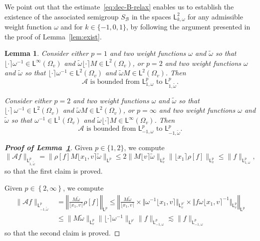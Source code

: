 \documentclass[11pt]{amsart}
\newtheorem{lemma}[theorem]{Lemma}
\theoremstyle{definition}
\theoremstyle{remark}
\numberwithin{equation}{section}
\def\AA{{\mathcal A}}
\def\BB{{\mathcal B}}
\newcommand{\sfL}{\mathsf{L}}
\newcommand{\wangle}[1]{\lfloor #1 \rceil}
\begin{document}
We point out that the estimate~\eqref{eq:dec-B-relax} enables us to establish the existence of the associated semigroup $S_\BB$ in the spaces $\sfL^{2}_{k,\omega}$ for any admissible weight function $\omega$ and for $k \in \{-1, 0, 1\}$, by following the argument presented in the proof of Lemma~\ref{lem:exist}.

\begin{lemma}
  \label{lem-relax-AAf}
  Consider either $p = 1$ and two weight functions $\omega$ and $\tilde{\omega}$ so that $\wangle{\cdot} \omega ^{-1} \in \sfL^{\infty}(\Omega_v)$ and $\tilde \omega \wangle{\cdot} M \in \sfL^{2}(\Omega_v)$, or $p=2$ and two weight functions $\omega$ and $\tilde{\omega}$ so that   $\wangle{\cdot} \omega ^{-1} \in \sfL^{2}(\Omega_v)$ and $\tilde \omega  M \in \sfL^{2}(\Omega_v)$. Then
  \begin{equation*}
    \text{$\AA$ is bounded from $\sfL^{p}_{1,\omega}$ to $\sfL^{p}_{1,\tilde \omega}$.}
  \end{equation*}

  Consider either $p= 2$ and two weight functions $\omega$ and $\tilde{\omega}$ so that $\wangle{\cdot} \,\omega^{-1} \in \sfL^{2}(\Omega_v)$ and $\tilde \omega M \in \sfL^{2}(\Omega_v)$, or $p=\infty$ and two weight functions $\omega$ and $\tilde{\omega}$ so that $\omega^{-1} \in \sfL^{1}(\Omega_v)$ and $\tilde \omega \wangle{\cdot} M \in \sfL^{\infty}(\Omega_v)$. Then
  \begin{equation*}
    \text{$\AA$ is bounded from $\sfL^{p}_{-1,\omega}$ to $\sfL^{p}_{-1,\tilde \omega}$.}
  \end{equation*}
\end{lemma}

\begin{proof}[{\bf \bf Proof of Lemma~\ref{lem-relax-AAf}}]
  Given $p \in \lbrace 1 , 2 \rbrace$, we compute
  \begin{equation*}
    \| \AA f \|_{\sfL^{p}_{1,\tilde \omega}}
    = \big\| \rho[f] M \wangle{x_1,v} \tilde \omega \big\|_{\sfL^{p}} \le 2 \big\| M \wangle{v}\tilde \omega \big\|_{\sfL^{p}_v}  \big\| \wangle{x_1} \rho[f] \big\|_{\sfL^{p}_x}
    \le \|   f \|_{\sfL^{p}_{1,\omega }},
  \end{equation*}
  so that the first claim is proved.

  Given $p \in \left\lbrace 2, \infty \right\rbrace$, we compute
  \begin{align*}
    \| \AA f \|_{\sfL^{p}_{-1,\tilde \omega}}
    &= \left\Vert \frac{M \tilde \omega}{\wangle{x_1,v}} \rho[f]  \right \Vert_{\sfL^{p}} \leq \left\Vert \frac{M \tilde \omega}{\wangle{x_1,v}} \times \big\Vert \omega^{-1} \wangle{x_1,v}\big\Vert_{\sfL_{v}^{p'}} \times \big\Vert f \omega \wangle{x_1,v}^{-1}\big\Vert_{\sfL^p_v} \right\Vert_{\sfL^{p}}\\
    &\le \|  M \tilde \omega   \|_{\sfL^{p}_v} \| \wangle{\cdot} \omega^{-1} \|_{\sfL^{p'}} \| f \|_{\sfL^{p}_{-1,\omega}} \lesssim \| f \|_{\sfL^{p}_{-1,\omega}}
  \end{align*}
  so that the second claim is proved.
\end{proof}
\end{document}
